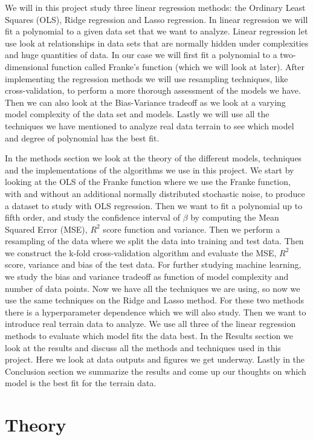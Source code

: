 \documentclass[12pt,a4paper,english]{article}
\begin{document}
We will in this project study three linear regression methods: the Ordinary Least Squares (OLS), Ridge regression and Lasso regression. In linear regression we will fit a polynomial to a given data set that we want to analyze. Linear regression let use look at relationships in data sets that are normally hidden under complexities and huge quantities of data. In our case we will first fit a polynomial to a two-dimensional function called Franke's function (which we will look at later). After implementing the regression methods we will use resampling techniques, like cross-validation, to perform a more thorough assessment of the models we have. Then we can also look at the Bias-Variance tradeoff as we look at a varying model complexity of the data set and models. Lastly we will use all the techniques we have mentioned to analyze real data terrain to see which model and degree of polynomial has the best fit.

In the methods section we look at the theory of the different models, techniques and the implementations of the algorithms we use in this project. We start by looking at the OLS of the Franke function where we use the Franke function, with and without an additional normally distributed stochastic noise, to produce a dataset to study with OLS regression. Then we want to fit a polynomial up to fifth order, and study the confidence interval of $\beta$ by computing the Mean Squared Error (MSE), $R^2$ score function and variance. Then we perform a resampling of the data where we split the data into training and test data. Then we construct the k-fold cross-validation algorithm and evaluate the MSE, $R^2$ score, variance and bias of the test data. For further studying machine learning, we study the bias and variance tradeoff as function of model complexity and number of data points. Now we have all the techniques we are using, so now we use the same techniques on the Ridge and Lasso method. For these two methods there is a hyperparameter dependence which we will also study. Then we want to introduce real terrain data to analyze. We use all three of the linear regression methods to evaluate which model fits the data best. In the Results section we look at the results and discuss all the methods and techniques used in this project. Here we look at data outputs and figures we get underway. Lastly in the Conclusion section we summarize the results and come up our thoughts on which model is the best fit for the terrain data.

\section{Theory}
\end{document}
